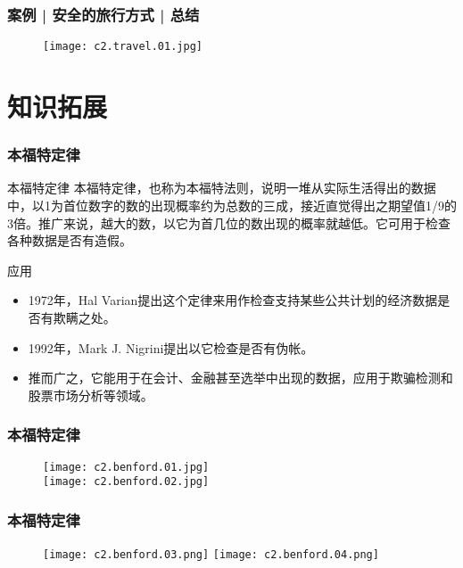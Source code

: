 \begin{frame}
  \frametitle{案例 | 安全的旅行方式 | 总结}
  \begin{figure}
    \centering
    \texttt{[image: c2.travel.01.jpg]}
  \end{figure}
\end{frame}

\section{知识拓展}
\begin{frame}
  \frametitle{本福特定律}
  \begin{block}{本福特定律}
本福特定律，也称为本福特法则，说明一堆从实际生活得出的数据中，以1为首位数字的数的出现概率约为总数的三成，接近直觉得出之期望值1/9的3倍。推广来说，越大的数，以它为首几位的数出现的概率就越低。它可用于检查各种数据是否有造假。
  \end{block}
  \pause
  \begin{block}{应用}
    \begin{itemize}
      \item 1972年，Hal Varian提出这个定律来用作检查支持某些公共计划的经济数据是否有欺瞒之处。
      \item 1992年，Mark J. Nigrini提出以它检查是否有伪帐。
      \item 推而广之，它能用于在会计、金融甚至选举中出现的数据，应用于欺骗检测和股票市场分析等领域。
    \end{itemize}
  \end{block}
\end{frame}

\begin{frame}
  \frametitle{本福特定律}
  \begin{figure}
    \centering
    \texttt{[image: c2.benford.01.jpg]}\\
    \texttt{[image: c2.benford.02.jpg]}
  \end{figure}
\end{frame}

\begin{frame}
  \frametitle{本福特定律}
  \begin{figure}
    \centering
    \texttt{[image: c2.benford.03.png]}
    \texttt{[image: c2.benford.04.png]}
  \end{figure}
\end{frame}

